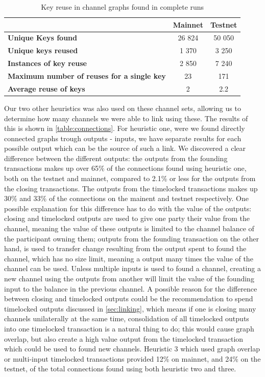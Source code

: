 \begin{table}[ht]
\centering
\caption{Key reuse in channel graphs found in complete runs}
\label{key_reuse_table}
\begin{tabular}{l|c|c}
                                                    & \textbf{Mainnet} & \textbf{Testnet} \\ \hline
\textbf{Unique Keys found}                         & 26 824              & 50 050 \\ \hline
\textbf{Unique keys reused}                        & 1 370               & 3 250 \\ \hline
\textbf{Instances of key reuse}                    & 2 850               & 7 240 \\ \hline
\textbf{Maximum number of reuses for a single key} & 23               & 171 \\ \hline
\textbf{Average reuse of keys}                     & 2                & 2.2  \\ \hline
\end{tabular}
\end{table}

Our two other heuristics was also used on these channel sets, allowing us to determine how many channels we were able to link using these. The results of this is shown in \cref{table:connections}. For heuristic one, were we found directly connected graphs trough outputs - inputs, we have separate results for each possible output which can be the source of such a link. We discovered a clear difference between the different outputs: the outputs from the founding transactions makes up over 65\% of the connections found using heuristic one, both on the testnet and mainnet, compared to 2.1\% or less for the outputs from the closing transactions. The outputs from the timelocked transactions makes up 30\% and 33\% of the connections on the mainent and testnet respectively. One possible explanation for this difference has to do with the value of the outputs: closing and timelocked outputs are used to give one party their value from the channel, meaning the value of these outputs is limited to the channel balance of the participant owning them; outputs from the founding transaction on the other hand, is used to transfer change resulting from the output spent to found the channel, which has no size limit, meaning a output many times the value of the channel can be used. Unless multiple inputs is used to found a channel, creating a new channel using the outputs from another will limit the value of the founding input to the balance in the previous channel. A possible reason for the difference between closing and timelocked outputs could be the recommendation to spend timelocked outputs discussed in \cref{sec:linking}, which means if one is closing many channels unilaterally at the same time, consolidation of all timelocked outputs into one timelocked transaction is a natural thing to do; this would cause graph overlap, but also create a high value output from the timelocked transaction which could be used to found new channels. Heuristic 3 which used graph overlap or multi-input timelocked transactions provided 12\% on mainnet, and 24\% on the testnet, of the total connections found using both heuristic two and three.

